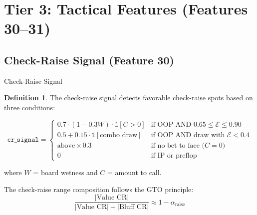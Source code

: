 \documentclass[11pt, a4paper]{article}
\theoremstyle{definition}
\newtheorem{definition}{Definition}[section]
\newcommand{\feature}[1]{\texttt{#1}}
\begin{document}
\section{Tier 3: Tactical Features (Features 30--31)}

\subsection{Check-Raise Signal (Feature 30)}

\begin{featurebox}{Check-Raise Signal}
\begin{definition}
The check-raise signal detects favorable check-raise spots based on three conditions:

\begin{equation}
    \feature{cr\_signal} = \begin{cases}
        0.7 \cdot (1 - 0.3W) \cdot \mathbb{1}[C > 0] & \text{if OOP AND } 0.65 \leq \mathcal{E} \leq 0.90 \\[4pt]
        0.5 + 0.15 \cdot \mathbb{1}[\text{combo draw}] & \text{if OOP AND draw with } \mathcal{E} < 0.4 \\[4pt]
        \text{above} \times 0.3 & \text{if no bet to face (}C = 0\text{)} \\
        0 & \text{if IP or preflop}
    \end{cases}
\end{equation}

where $W$ = board wetness and $C$ = amount to call.

The check-raise range composition follows the GTO principle:
\begin{equation}
    \frac{|\text{Value CR}|}{|\text{Value CR}| + |\text{Bluff CR}|} \approx 1 - \alpha_{\text{raise}}
\end{equation}
\end{definition}
\end{featurebox}
\end{document}
